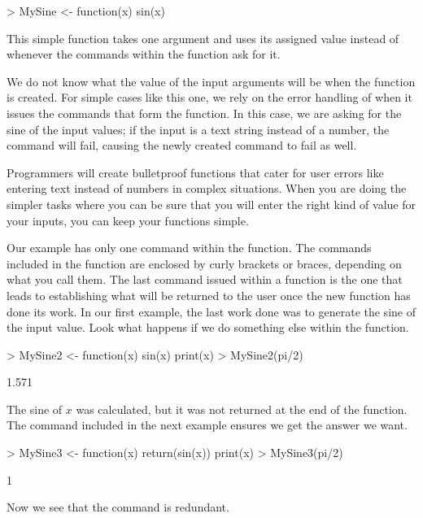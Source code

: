 \begin{Schunk}
\begin{Sinput}
> MySine <- function(x){ sin(x)} 
\end{Sinput}
\end{Schunk}

This simple function takes one argument  and uses its assigned value instead of  whenever the commands within the function ask for it. 
 
We do not know what the value of the input arguments will be when the function is created. For simple cases like this one, we rely on the error handling of \R{} when it issues the commands that form the function. In this case, we are asking for the sine of the input values; if the input is a text string instead of a number, the  command will fail, causing the newly created  command to fail as well. 
 
Programmers will create bulletproof functions that cater for user errors like entering text instead of numbers in complex situations. When you are doing the simpler tasks where you can be sure that you will enter the right kind of value for your inputs, you can keep your functions simple. 
 
Our example has only one command within the function. The commands included in the function are enclosed by curly brackets or braces, depending on what you call them. The last command issued within a function is the one that leads to establishing what will be returned to the user once the new function has done its work. In our first example, the last work done was to generate the sine of the input value. Look what happens if we do something else within the function. 

\begin{Schunk}
\begin{Sinput}
> MySine2 <- function(x){ sin(x) 
   print(x)} 
> MySine2(pi/2) 
\end{Sinput}
\begin{Soutput}
[1] 1.571
\end{Soutput}
\end{Schunk}

The sine of $x$ was calculated, but it was not returned at the end of the function. 
The  command included in the next example ensures we get the answer we want. 

\begin{Schunk}
\begin{Sinput}
> MySine3 <- function(x){ return(sin(x)) 
   print(x)} 
> MySine3(pi/2) 
\end{Sinput}
\begin{Soutput}
[1] 1
\end{Soutput}
\end{Schunk}

Now we see that the  command is redundant. 
 
 
 



